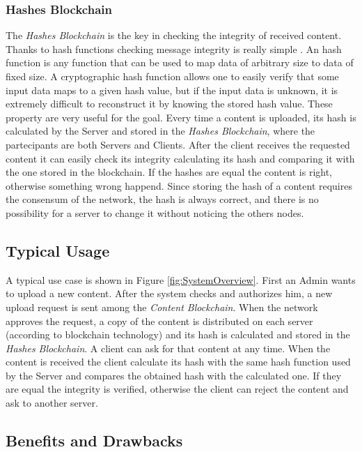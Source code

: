 \documentclass[conference,compsoc]{IEEEtran}
\begin{document}
\subsubsection{Hashes Blockchain}
The \textit{Hashes Blockchain} is the key in checking the integrity of received content. Thanks to hash functions checking message integrity is really simple \cite{tsudik1992message}. An hash function is any function that can be used to map data of arbitrary size to data of fixed size. A cryptographic hash function allows one to easily verify that some input data maps to a given hash value, but if the input data is unknown, it is extremely difficult to reconstruct it by knowing the stored hash value. These property are very useful for the goal. Every time a content is uploaded, its hash is calculated by the Server and stored in the \textit{Hashes Blockchain}, where the partecipants are both Servers and Clients. After the client receives the requested content it can easily check its integrity calculating its hash and comparing it with the one stored in the blockchain. If the hashes are equal the content is right, otherwise something wrong happend. Since storing the hash of a content requires the consensum of the network, the hash is always correct, and there is no possibility for a server to change it without noticing the others nodes. 
	
\subsection{Typical Usage}
A typical use case is shown in Figure \ref{fig:SystemOverview}. First an Admin wants to upload a new content. After the system checks and authorizes him, a new upload request is sent among the \textit{Content Blockchain}. When the network approves the request, a copy of the content is distributed on each server (according to blockchain technology) and its hash is calculated and stored in the \textit{Hashes Blockchain}. A client can ask for that content at any time. When the content is received the client calculate its hash with the same hash function used by the Server and compares the obtained hash with the calculated one. If they are equal the integrity is verified, otherwise the client can reject the content and ask to another server.

\subsection{Benefits and Drawbacks}
\end{document}
